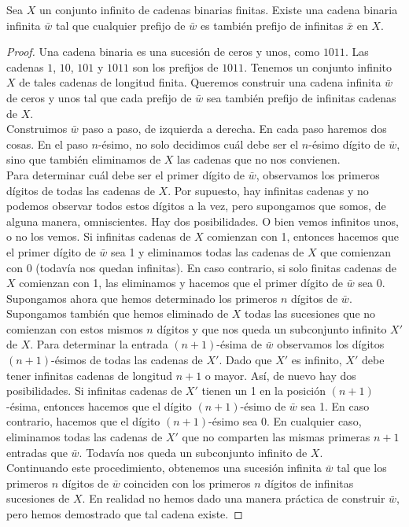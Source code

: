 \documentclass[12pt,a4paper]{book}
\begin{document}
    \begin{lema}\label{lema:cadenas-binarias}
        Sea $X$ un conjunto infinito de cadenas binarias finitas. Existe una cadena binaria infinita $\bar{w}$ tal que
        cualquier prefijo de $\bar{w}$ es también prefijo de infinitas $\bar{x}$ en $X$.
    \end{lema}
    \begin{proof}
        Una cadena binaria es una sucesión de ceros y unos, como $1011$. Las cadenas $1$, $10$, $101$ y $1011$ son los
        prefijos de $1011$. Tenemos un conjunto infinito $X$ de tales cadenas de longitud finita. Queremos construir una
        cadena infinita $\bar{w}$ de ceros y unos tal que cada prefijo de $\bar{w}$ sea también prefijo de infinitas
        cadenas de $X$.\\
        Construimos $\bar{w}$ paso a paso, de izquierda a derecha. En cada paso haremos dos cosas. En el paso $n$-ésimo, no
        solo decidimos cuál debe ser el $n$-ésimo dígito de $\bar{w}$, sino que también eliminamos de $X$ las cadenas que no
        nos convienen.\\
        Para determinar cuál debe ser el primer dígito de $\bar{w}$, observamos los primeros dígitos de todas las cadenas de
        $X$. Por supuesto, hay infinitas cadenas y no podemos observar todos estos dígitos a la vez, pero supongamos que
        somos, de alguna manera, omniscientes. Hay dos posibilidades. O bien vemos infinitos unos, o no los vemos. Si
        infinitas cadenas de $X$ comienzan con 1, entonces hacemos que el primer dígito de $\bar{w}$ sea 1 y eliminamos
        todas las cadenas de $X$ que comienzan con 0 (todavía nos quedan infinitas). En caso contrario, si solo finitas
        cadenas de $X$ comienzan con 1, las eliminamos y hacemos que el primer dígito de $\bar{w}$ sea 0.\\
        Supongamos ahora que hemos determinado los primeros $n$ dígitos de $\bar{w}$. Supongamos también que hemos
        eliminado de $X$ todas las sucesiones que no comienzan con estos mismos $n$ dígitos y que nos queda un subconjunto
        infinito $X'$ de $X$. Para determinar la entrada $(n+1)$-ésima de $\bar{w}$ observamos los dígitos $(n+1)$-ésimos de
        todas las cadenas de $X'$. Dado que $X'$ es infinito, $X'$ debe tener infinitas cadenas de longitud $n+1$ o mayor.
        Así, de nuevo hay dos posibilidades. Si infinitas cadenas de $X'$ tienen un 1 en la posición $(n+1)$-ésima, entonces
        hacemos que el dígito $(n+1)$-ésimo de $\bar{w}$ sea 1. En caso contrario, hacemos que el dígito $(n+1)$-ésimo sea 0.
        En cualquier caso, eliminamos todas las cadenas de $X'$ que no comparten las mismas primeras $n+1$ entradas que
        $\bar{w}$. Todavía nos queda un subconjunto infinito de $X$.\\
        Continuando este procedimiento, obtenemos una sucesión infinita $\bar{w}$ tal que los primeros $n$ dígitos de
        $\bar{w}$ coinciden con los primeros $n$ dígitos de infinitas sucesiones de $X$. En realidad no hemos dado una
        manera práctica de construir $\bar{w}$, pero hemos demostrado que tal cadena existe.
    \end{proof}
\end{document}
